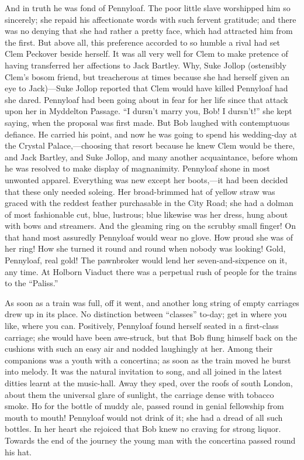 And in truth he was fond of Pennyloaf. The poor little slave worshipped
him so sincerely; she repaid his affectionate words with such fervent
gratitude; and there was no denying that she had rather a pretty face,
which had attracted him from the first. But above all, this preference
accorded to so humble a rival had set Clem Peckover beside herself. It
was all very well for Clem to make pretence of having transferred her
{}affections to Jack Bartley. Why, Suke Jollop (ostensibly Clem's bosom
friend, but treacherous at times because she had herself given an eye to
Jack)---Suke Jollop reported that Clem would have killed Pennyloaf had
she dared. Pennyloaf had been going about in fear for her life since
that attack upon her in Myddelton Passage. ``I dursn't marry you, Bob! I
dursn't!'' she kept saying, when the proposal was first made. But Bob
laughed with contemptuous defiance. He carried his point, and now he was
going to spend his wedding-day at the Crystal Palace,---choosing that
resort because he knew Clem would be there, and Jack Bartley, and Suke
Jollop, and many another acquaintance, before whom he was resolved to
make display of magnanimity. Pennyloaf shone in most unwonted apparel.
Everything was new except her boots,---it had been decided that these
only needed soleing. Her broad-brimmed hat of yellow straw was graced
with the reddest feather purchasable in the City Road; she had a dolman
of most fashionable cut, blue, lustrous; blue {}likewise was her dress,
hung about with bows and streamers. And the gleaming ring on the scrubby
small finger! On that hand most assuredly Pennyloaf would wear no glove.
How proud she was of her ring! How she turned it round and round when
nobody was looking! Gold, Pennyloaf, real gold! The pawnbroker would
lend her seven-and-sixpence on it, any time. At Holborn Viaduct there
was a perpetual rush of people for the trains to the ``Paliss.''

As soon as a train was full, off it went, and another long string of
empty carriages drew up in its place. No distinction between ``classes''
to-day; get in where you like, where you can. Positively, Pennyloaf
found herself seated in a first-class carriage; she would have been
awe-struck, but that Bob flung himself back on the cushions with such an
easy air and nodded laughingly at her. Among their companions was a
youth with a concertina; as soon as the train moved he burst into
melody. It was the natural invitation to song, and all joined in the
latest {}ditties learnt at the music-hall. Away they sped, over the
roofs of south London, about them the universal glare of sunlight, the
carriage dense with tobacco smoke. Ho for the bottle of muddy ale,
passed round in genial fellowship from mouth to mouth! Pennyloaf would
not drink of it; she had a dread of all such bottles. In her heart she
rejoiced that Bob knew no craving for strong liquor. Towards the end of
the journey the young man with the concertina passed round his hat.

